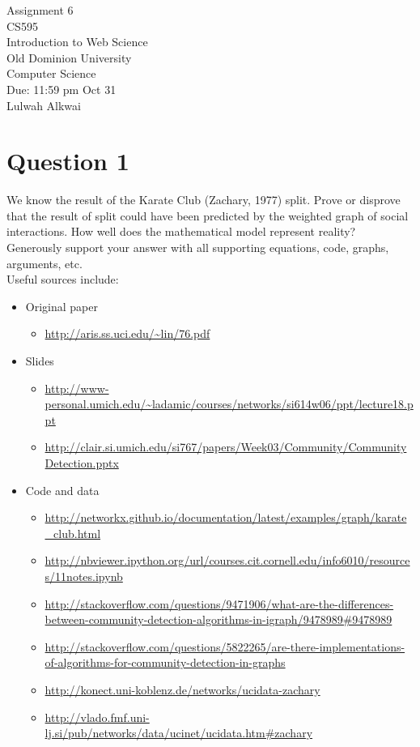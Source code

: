 \documentclass[letterpaper,11pt]{article}
\begin{document}
\begin{titlepage}
\begin{center}
\Huge{Assignment 6}
\\
\Large{CS595}
\\
\Large{Introduction to Web Science}
\\
\Large{Old Dominion University}
\\
\Large{Computer Science}
\\
\Large{Due: 11:59 pm Oct 31}
\\
\Large{Lulwah Alkwai}
\\
\end{center}
\end{titlepage}
\newpage

\section*{Question 1}

We know the result of the Karate Club (Zachary, 1977) split. Prove or disprove that the result of split could have been predicted by the weighted graph of social interactions. How well does the mathematical model represent reality? \\
Generously support your answer with all supporting equations, code, graphs, arguments, etc. \\
Useful sources include:
\begin{itemize}
\item Original paper
\begin{itemize}
\item \url{http://aris.ss.uci.edu/~lin/76.pdf}
\end{itemize}
\item Slides 
\begin{itemize}
\item \url{http://www-personal.umich.edu/~ladamic/courses/networks/si614w06/ppt/lecture18.ppt}
\item \url{http://clair.si.umich.edu/si767/papers/Week03/Community/CommunityDetection.pptx}
\end{itemize}
\item{Code and data}
\begin{itemize}
\item \url{http://networkx.github.io/documentation/latest/examples/graph/karate_club.html}
\item \url{http://nbviewer.ipython.org/url/courses.cit.cornell.edu/info6010/resources/11notes.ipynb}
\item \url{http://stackoverflow.com/questions/9471906/what-are-the-differences-between-community-detection-algorithms-in-igraph/9478989#9478989}
\item \url{http://stackoverflow.com/questions/5822265/are-there-implementations-of-algorithms-for-community-detection-in-graphs}
\item \url{http://konect.uni-koblenz.de/networks/ucidata-zachary}
\item \url{http://vlado.fmf.uni-lj.si/pub/networks/data/ucinet/ucidata.htm#zachary}
\end{itemize}
\end{itemize}
\newpage
\end{document}
